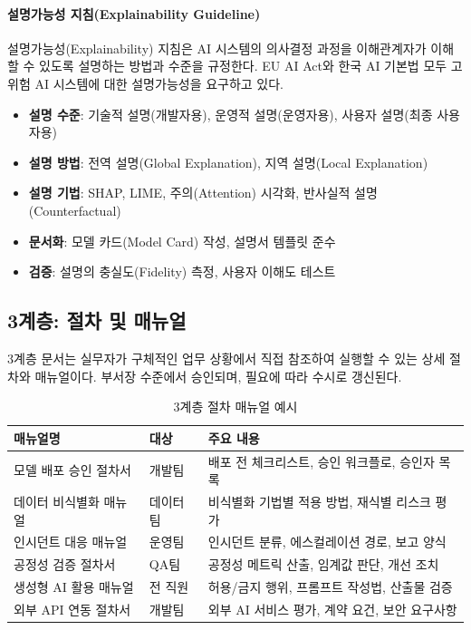 \paragraph{설명가능성 지침(Explainability Guideline)}
설명가능성(Explainability) 지침은 AI 시스템의 의사결정 과정을 이해관계자가 이해할 수 있도록 설명하는 방법과 수준을 규정한다. EU AI Act와 한국 AI 기본법\cite{cset2025korea_ai_act} 모두 고위험 AI 시스템에 대한 설명가능성을 요구하고 있다.

\begin{itemize}
 \item \textbf{설명 수준}: 기술적 설명(개발자용), 운영적 설명(운영자용), 사용자 설명(최종 사용자용)
 \item \textbf{설명 방법}: 전역 설명(Global Explanation), 지역 설명(Local Explanation)
 \item \textbf{설명 기법}: SHAP, LIME, 주의(Attention) 시각화, 반사실적 설명(Counterfactual)
 \item \textbf{문서화}: 모델 카드(Model Card) 작성, 설명서 템플릿 준수
 \item \textbf{검증}: 설명의 충실도(Fidelity) 측정, 사용자 이해도 테스트
\end{itemize}

\subsection{3계층: 절차 및 매뉴얼}
\label{sec:5.1.4}

3계층 문서는 실무자가 구체적인 업무 상황에서 직접 참조하여 실행할 수 있는 상세 절차와 매뉴얼이다. 부서장 수준에서 승인되며, 필요에 따라 수시로 갱신된다.

\begin{table}[htbp]
\centering
\caption{3계층 절차 매뉴얼 예시}
\label{tab:procedure_examples}
\begin{tabularx}{\textwidth}{p{3.5cm}p{2cm}X}
\toprule
\textbf{매뉴얼명} & \textbf{대상} & \textbf{주요 내용} \\
\midrule
모델 배포 승인 절차서 & 개발팀 & 배포 전 체크리스트, 승인 워크플로, 승인자 목록 \\
데이터 비식별화 매뉴얼 & 데이터팀 & 비식별화 기법별 적용 방법, 재식별 리스크 평가 \\
인시던트 대응 매뉴얼 & 운영팀 & 인시던트 분류, 에스컬레이션 경로, 보고 양식 \\
공정성 검증 절차서 & QA팀 & 공정성 메트릭 산출, 임계값 판단, 개선 조치 \\
생성형 AI 활용 매뉴얼 & 전 직원 & 허용/금지 행위, 프롬프트 작성법, 산출물 검증 \\
외부 API 연동 절차서 & 개발팀 & 외부 AI 서비스 평가, 계약 요건, 보안 요구사항 \\
\bottomrule
\end{tabularx}
\end{table}

